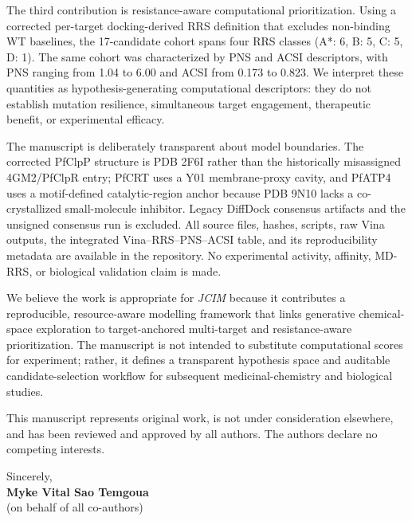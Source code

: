 \documentclass[10.5pt,letterpaper]{article}
\begin{document}
The third contribution is resistance-aware computational prioritization. Using a corrected per-target docking-derived RRS definition that excludes non-binding WT baselines, the \num{17}-candidate cohort spans four RRS classes (A*: \num{6}, B: \num{5}, C: \num{5}, D: \num{1}). The same cohort was characterized by PNS and ACSI descriptors, with PNS ranging from \num{1.04} to \num{6.00} and ACSI from \num{0.173} to \num{0.823}. We interpret these quantities as hypothesis-generating computational descriptors: they do not establish mutation resilience, simultaneous target engagement, therapeutic benefit, or experimental efficacy.

The manuscript is deliberately transparent about model boundaries. The corrected PfClpP structure is PDB 2F6I rather than the historically misassigned 4GM2/PfClpR entry; PfCRT uses a Y01 membrane-proxy cavity, and PfATP4 uses a motif-defined catalytic-region anchor because PDB 9N10 lacks a co-crystallized small-molecule inhibitor. Legacy DiffDock consensus artifacts and the unsigned consensus run is excluded. All source files, hashes, scripts, raw Vina outputs, the integrated Vina--RRS--PNS--ACSI table, and its reproducibility metadata are available in the repository. No experimental activity, affinity, MD-RRS, or biological validation claim is made.

We believe the work is appropriate for \textit{JCIM} because it contributes a reproducible, resource-aware modelling framework that links generative chemical-space exploration to target-anchored multi-target and resistance-aware prioritization. The manuscript is not intended to substitute computational scores for experiment; rather, it defines a transparent hypothesis space and auditable candidate-selection workflow for subsequent medicinal-chemistry and biological studies.

This manuscript represents original work, is not under consideration elsewhere, and has been reviewed and approved by all authors. The authors declare no competing interests.

\vspace{0.35em}
Sincerely,\\[0.25em]
\textbf{Myke Vital Sao Temgoua}\\
(on behalf of all co-authors)
\end{document}

